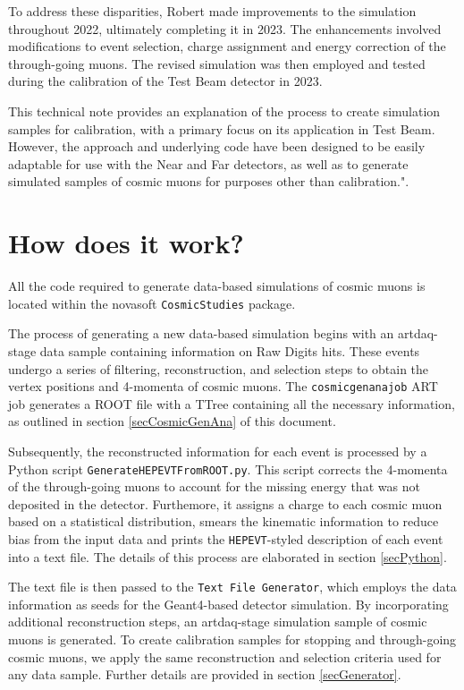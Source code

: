 \documentclass[12pt]{article}
\begin{document}
To address these disparities, Robert made improvements to the simulation throughout 2022, ultimately completing it in 2023. The enhancements involved modifications to event selection, charge assignment and energy correction of the through-going muons. The revised simulation was then employed and tested during the calibration of the Test Beam detector in 2023.

This technical note provides an explanation of the process to create simulation samples for calibration, with a primary focus on its application in Test Beam. However, the approach and underlying code have been designed to be easily adaptable for use with the Near and Far detectors, as well as to generate simulated samples of cosmic muons for purposes other than calibration.".

\section{How does it work?}

All the code required to generate data-based simulations of cosmic muons is located within the novasoft \texttt{CosmicStudies} package.

The process of generating a new data-based simulation begins with an artdaq-stage data sample containing information on Raw Digits hits. These events undergo a series of filtering, reconstruction, and selection steps to obtain the vertex positions and 4-momenta of cosmic muons. The \texttt{cosmicgenanajob} ART job generates a ROOT file with a TTree containing all the necessary information, as outlined in section \ref{secCosmicGenAna} of this document.

Subsequently, the reconstructed information for each event is processed by a Python script \texttt{GenerateHEPEVTFromROOT.py}. This script corrects the 4-momenta of the through-going muons to account for the missing energy that was not deposited in the detector. Furthemore, it assigns a charge to each cosmic muon based on a statistical distribution, smears the kinematic information to reduce bias from the input data and prints the \texttt{HEPEVT}-styled description of each event into a text file. The details of this process are elaborated in section \ref{secPython}. 

The text file is then passed to the \texttt{Text File Generator}, which employs the data information as seeds for the Geant4-based detector simulation. By incorporating additional reconstruction steps, an artdaq-stage simulation sample of cosmic muons is generated. To create calibration samples for stopping and through-going cosmic muons, we apply the same reconstruction and selection criteria used for any data sample. Further details are provided in section \ref{secGenerator}. 
\end{document}
